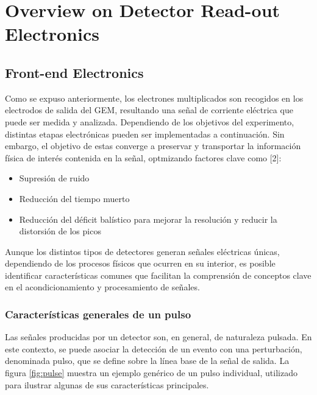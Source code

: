 \documentclass[]{book}
\begin{document}

\chapter*{Overview on Detector Read-out Electronics }

\section{Front-end Electronics}

\noindent Como se expuso anteriormente, los electrones multiplicados son recogidos en los electrodos de salida del GEM, resultando una señal de corriente eléctrica que puede ser medida y analizada. Dependiendo de los objetivos del experimento, distintas etapas electrónicas pueden ser implementadas a continuación. Sin embargo, el objetivo de estas converge a preservar y transportar la información física de interés contenida en la señal, optmizando factores clave como [2]:

\begin{itemize}
    \item Supresión de ruido 
    \item Reducción del tiempo muerto
    \item Reducción del déficit balístico para mejorar la resolución y reducir la distorsión de los picos
\end{itemize}

\noindent Aunque los distintos tipos de detectores generan señales eléctricas únicas, dependiendo de los procesos físicos que ocurren en su interior, es posible identificar características comunes que facilitan la comprensión de conceptos clave en el acondicionamiento y procesamiento de señales.

\subsection{Características generales de un pulso}

\noindent Las señales producidas por un detector son, en general, de naturaleza pulsada. En este contexto, se puede asociar la detección de un evento con una perturbación, denominada pulso, que se define sobre la línea base de la señal de salida. La figura \ref{fig:pulse} muestra un ejemplo genérico de un pulso individual, utilizado para ilustrar algunas de sus características principales.\\
\end{document}
